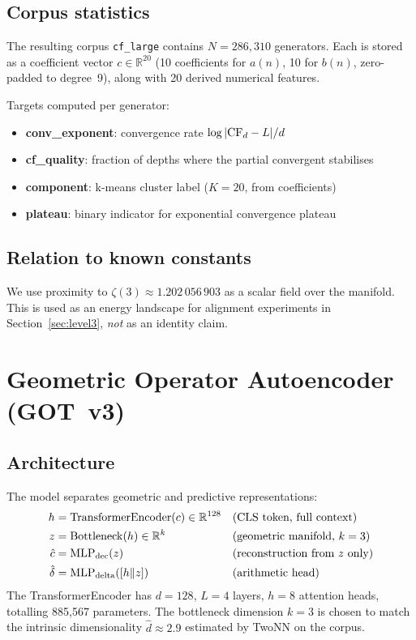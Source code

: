 \documentclass[11pt,a4paper]{article}
\begin{document}
\subsection{Corpus statistics}

The resulting corpus \texttt{cf\_large} contains $N = 286{,}310$ generators.
Each is stored as a coefficient vector $c \in \mathbb{R}^{20}$ (10
coefficients for $a(n)$, 10 for $b(n)$, zero-padded to degree~9), along
with 20 derived numerical features.

Targets computed per generator:
\begin{itemize}[noitemsep]
  \item \textbf{conv\_exponent}: convergence rate $\log|{\rm CF}_d - L| / d$
  \item \textbf{cf\_quality}: fraction of depths where the partial convergent
        stabilises
  \item \textbf{component}: k-means cluster label ($K=20$, from coefficients)
  \item \textbf{plateau}: binary indicator for exponential convergence plateau
\end{itemize}

\subsection{Relation to known constants}

We use proximity to $\zeta(3) \approx 1.202\,056\,903$ as a scalar field
over the manifold.  This is used as an energy landscape for alignment
experiments in Section~\ref{sec:level3}, \emph{not} as an identity claim.

\section{Geometric Operator Autoencoder (GOT~v3)}
\label{sec:model}

\subsection{Architecture}

The model separates geometric and predictive representations:
\begin{align}
  h &= \mathrm{TransformerEncoder}(c) \in \mathbb{R}^{128}
    & &\text{(CLS token, full context)} \\
  z &= \mathrm{Bottleneck}(h) \in \mathbb{R}^k
    & &\text{(geometric manifold, } k = 3\text{)} \\
  \hat{c} &= \mathrm{MLP}_{\rm dec}(z)
    & &\text{(reconstruction from } z \text{ only)} \\
  \hat{\delta} &= \mathrm{MLP}_{\rm delta}([h \| z])
    & &\text{(arithmetic head)}
\end{align}
The TransformerEncoder has $d=128$, $L=4$ layers, $h=8$ attention heads,
totalling 885{,}567 parameters.  The bottleneck dimension $k=3$ is chosen to
match the intrinsic dimensionality $\hat{d} \approx 2.9$ estimated by TwoNN
\cite{levina2005intrinsic} on the corpus.
\end{document}
